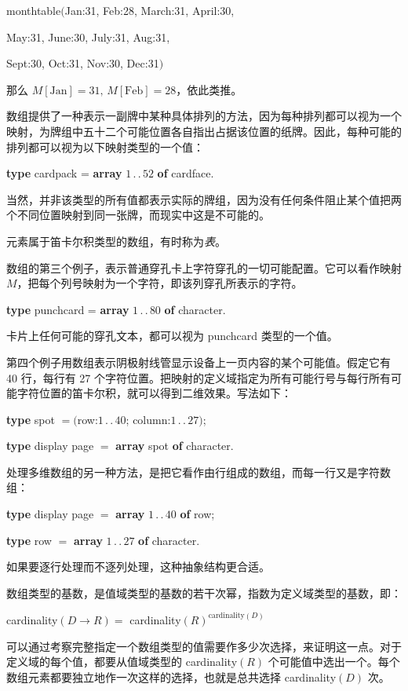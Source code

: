 \quad monthtable$($Jan:31, Feb:28, March:31, April:30,

\quad May:31, June:30, July:31, Aug:31,

\quad Sept:30, Oct:31, Nov:30, Dec:31$)$

\noindent
那么 $M[\text{Jan}] = 31,\, M[\text{Feb}] = 28$，依此类推。

数组提供了一种表示一副牌中某种具体排列的方法，因为每种排列都可以视为一个映射，为牌组中五十二个可能位置各自指出占据该位置的纸牌。因此，每种可能的排列都可以视为以下映射类型的一个值：

\quad \textbf{type} cardpack = \textbf{array} $1\,.\,.\,52$ \textbf{of} cardface.

\noindent
当然，并非该类型的所有值都表示实际的牌组，因为没有任何条件阻止某个值把两个不同位置映射到同一张牌，而现实中这是不可能的。

元素属于笛卡尔积类型的数组，有时称为\textit{表}。

数组的第三个例子，表示普通穿孔卡上字符穿孔的一切可能配置。它可以看作映射 $M$，把每个列号映射为一个字符，即该列穿孔所表示的字符。

\quad \textbf{type} punchcard = \textbf{array} $1\,.\,.\,80$ \textbf{of} character.

\noindent
卡片上任何可能的穿孔文本，都可以视为 punchcard 类型的一个值。

第四个例子用数组表示阴极射线管显示设备上一页内容的某个可能值。假定它有 40 行，每行有 27 个字符位置。把映射的定义域指定为所有可能行号与每行所有可能字符位置的笛卡尔积，就可以得到二维效果。写法如下：

\quad \textbf{type} spot $= ($row:$1\,.\,.\,40$; column:$1\,.\,.\,27)$;

\quad \textbf{type} display page $=$ \textbf{array} spot \textbf{of} character.

处理多维数组的另一种方法，是把它看作由行组成的数组，而每一行又是字符数组：

\quad \textbf{type} display page $=$ \textbf{array} $1\,.\,.\,40$ \textbf{of} row;

\quad \textbf{type} row $=$ \textbf{array} $1\,.\,.\,27$ \textbf{of} character.

\noindent
如果要逐行处理而不逐列处理，这种抽象结构更合适。

数组类型的基数，是值域类型的基数的若干次幂，指数为定义域类型的基数，即：

\quad cardinality$(D \rightarrow R) =$ cardinality$(R)^{\text{cardinality}(D)}$

\noindent
可以通过考察完整指定一个数组类型的值需要作多少次选择，来证明这一点。对于定义域的每个值，都要从值域类型的 cardinality$(R)$ 个可能值中选出一个。每个数组元素都要独立地作一次这样的选择，也就是总共选择 cardinality$(D)$ 次。

